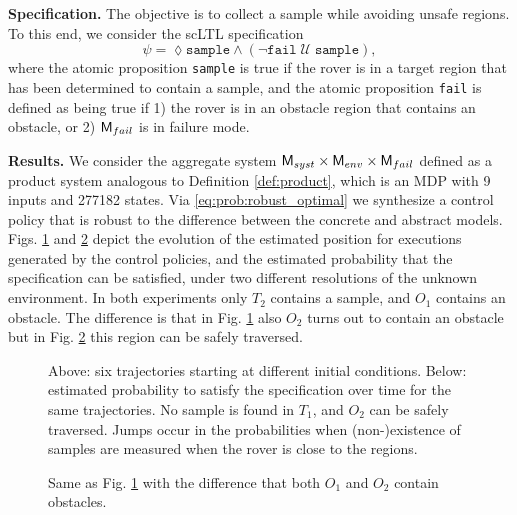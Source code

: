 \textbf{Specification.} The objective is to collect a sample while avoiding unsafe regions. To this end, we consider the scLTL specification
\begin{equation}
	\psi = \lozenge \texttt{sample} \land \left( \lnot \texttt{fail} \; \mathcal {U} \; \texttt{sample} \right),
\end{equation}
where the atomic proposition \texttt{sample} is true if the rover is in a target region that has been determined to contain a sample, and the atomic proposition \texttt{fail} is defined as being true if 1) the rover is in an obstacle region that contains an obstacle, or 2) $\mathsf{M}_{fail}$ is in failure mode.

\textbf{Results.} We consider the aggregate system $\mathsf{M}_{syst} \times \mathsf{M}_{env} \times \mathsf{M}_{fail}$ defined as a product system analogous to Definition \ref{def:product}, which is an MDP with 9 inputs and 277182 states. Via \eqref{eq:prob:robust_optimal} we synthesize a control policy that is robust to the difference between the concrete and abstract models. Figs. \ref{fig:exp1} and \ref{fig:exp2} depict the evolution of the estimated position for executions generated by the control policies, and the estimated probability that the specification can be satisfied, under two different resolutions of the unknown environment. In both experiments only $T_2$ contains a sample, and $O_1$ contains an obstacle. The difference is that in Fig. \ref{fig:exp1} also $O_2$ turns out to contain an obstacle but in Fig. \ref{fig:exp2} this region can be safely traversed.

\begin{figure}
	\footnotesize
	\setlength\figurewidth{\columnwidth} 
	\setlength{} 

	
	\setlength{} 

	
	\caption{Above: six trajectories starting at different initial conditions. Below: estimated probability to satisfy the specification over time for the same trajectories. No sample is found in $T_1$, and $O_2$ can be safely traversed. Jumps occur in the probabilities when (non-)existence of samples are measured when the rover is close to the regions.}
	\label{fig:exp1}
\end{figure}

\begin{figure}
	\footnotesize
	\setlength\figurewidth{\columnwidth} 
	\setlength{} 

	

	\setlength{} 

	
	\caption{Same as Fig. \ref{fig:exp1} with the difference that both $O_1$ and $O_2$ contain obstacles.}
	\label{fig:exp2}
\end{figure}